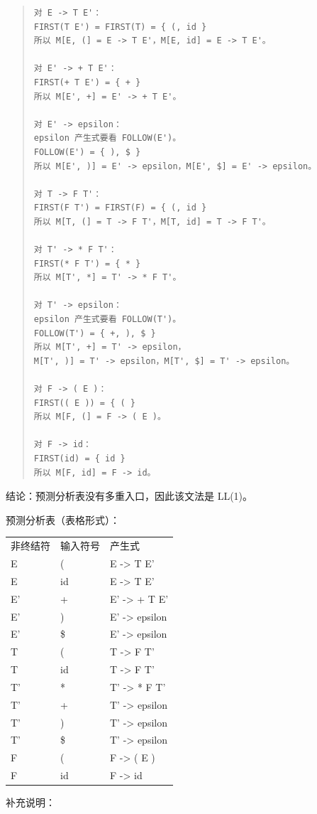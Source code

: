 \documentclass[UTF8,zihao=-4]{ctexart}
\begin{document}
\begin{quote}
\footnotesize
\begin{verbatim}
对 E -> T E'：
FIRST(T E') = FIRST(T) = { (, id }
所以 M[E, (] = E -> T E'，M[E, id] = E -> T E'。

对 E' -> + T E'：
FIRST(+ T E') = { + }
所以 M[E', +] = E' -> + T E'。

对 E' -> epsilon：
epsilon 产生式要看 FOLLOW(E')。
FOLLOW(E') = { ), $ }
所以 M[E', )] = E' -> epsilon，M[E', $] = E' -> epsilon。

对 T -> F T'：
FIRST(F T') = FIRST(F) = { (, id }
所以 M[T, (] = T -> F T'，M[T, id] = T -> F T'。

对 T' -> * F T'：
FIRST(* F T') = { * }
所以 M[T', *] = T' -> * F T'。

对 T' -> epsilon：
epsilon 产生式要看 FOLLOW(T')。
FOLLOW(T') = { +, ), $ }
所以 M[T', +] = T' -> epsilon，
M[T', )] = T' -> epsilon，M[T', $] = T' -> epsilon。

对 F -> ( E )：
FIRST(( E )) = { ( }
所以 M[F, (] = F -> ( E )。

对 F -> id：
FIRST(id) = { id }
所以 M[F, id] = F -> id。
\end{verbatim}
\end{quote}

结论：预测分析表没有多重入口，因此该文法是 LL(1)。

预测分析表（表格形式）：
\begin{center}\footnotesize
\begin{tabular}{lll}
非终结符 & 输入符号 & 产生式\\
E & ( & E -> T E'\\
E & id & E -> T E'\\
E' & + & E' -> + T E'\\
E' & ) & E' -> epsilon\\
E' & \$ & E' -> epsilon\\
T & ( & T -> F T'\\
T & id & T -> F T'\\
T' & * & T' -> * F T'\\
T' & + & T' -> epsilon\\
T' & ) & T' -> epsilon\\
T' & \$ & T' -> epsilon\\
F & ( & F -> ( E )\\
F & id & F -> id
\end{tabular}
\end{center}

补充说明：
\end{document}
